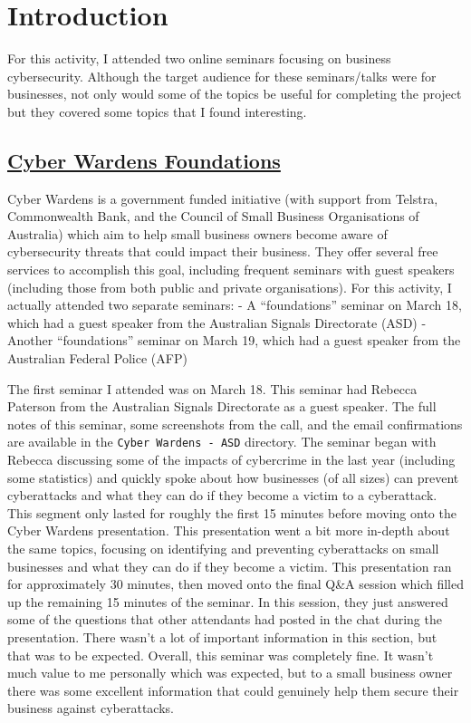 \hypertarget{introduction}{%
\section{Introduction}\label{introduction}}

For this activity, I attended two online seminars focusing on business
cybersecurity. Although the target audience for these seminars/talks
were for businesses, not only would some of the topics be useful for
completing the project but they covered some topics that I found
interesting.

\hypertarget{cyber-wardens-foundations}{%
\subsection{\texorpdfstring{\href{https://cyberwardens.com.au/webinars/}{Cyber
Wardens
Foundations}}{Cyber Wardens Foundations}}\label{cyber-wardens-foundations}}

Cyber Wardens is a government funded initiative (with support from
Telstra, Commonwealth Bank, and the Council of Small Business
Organisations of Australia) which aim to help small business owners
become aware of cybersecurity threats that could impact their business.
They offer several free services to accomplish this goal, including
frequent seminars with guest speakers (including those from both public
and private organisations). For this activity, I actually attended two
separate seminars: - A ``foundations'' seminar on March 18, which had a
guest speaker from the Australian Signals Directorate (ASD) - Another
``foundations'' seminar on March 19, which had a guest speaker from the
Australian Federal Police (AFP)

The first seminar I attended was on March 18. This seminar had Rebecca
Paterson from the Australian Signals Directorate as a guest speaker. The
full notes of this seminar, some screenshots from the call, and the
email confirmations are available in the \texttt{Cyber\ Wardens\ -\ ASD}
directory. The seminar began with Rebecca discussing some of the impacts
of cybercrime in the last year (including some statistics) and quickly
spoke about how businesses (of all sizes) can prevent cyberattacks and
what they can do if they become a victim to a cyberattack. This segment
only lasted for roughly the first 15 minutes before moving onto the
Cyber Wardens presentation. This presentation went a bit more in-depth
about the same topics, focusing on identifying and preventing
cyberattacks on small businesses and what they can do if they become a
victim. This presentation ran for approximately 30 minutes, then moved
onto the final Q\&A session which filled up the remaining 15 minutes of
the seminar. In this session, they just answered some of the questions
that other attendants had posted in the chat during the presentation.
There wasn't a lot of important information in this section, but that
was to be expected. Overall, this seminar was completely fine. It wasn't
much value to me personally which was expected, but to a small business
owner there was some excellent information that could genuinely help
them secure their business against cyberattacks.

